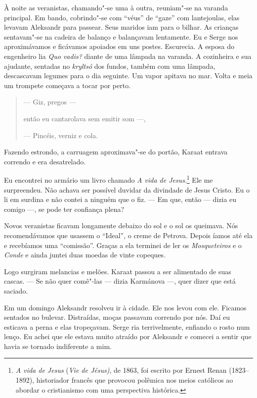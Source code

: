 À noite as veranistas, chamando"-se uma à outra, reuniam"-se na varanda
principal. Em bando, cobrindo"-se com ``véus'' de ``gaze'' com
lantejoulas, elas levavam Aleksandr para passear. Seus maridos iam para
o bilhar. As crianças sentavam"-se na cadeira de balanço e balançavam
lentamente. Eu e Serge nos aproximávamos e ficávamos apoiados em uns
postes. Escurecia. A esposa do engenheiro lia \emph{Quo vadis?} diante
de uma lâmpada na varanda. A cozinheira e sua ajudante, sentadas no
\emph{kryltsó} dos fundos, também com uma lâmpada, descascavam legumes
para o dia seguinte. Um vapor apitava no mar. Volta e meia um trompete
começava a tocar por perto.

\begin{quotation}
--- Giz, pregos ---

então eu cantarolava sem emitir som ---,

--- Pincéis, verniz e cola.
\end{quotation}

Fazendo estrondo, a carruagem aproximava"-se do portão, Karaat entrava
correndo e era desatrelado.

Eu encontrei no armário um livro chamado \emph{A vida de
Jesus}.\footnote{\emph{A vida de Jesus} (\emph{Vie de Jésus)}, de 1863,
  foi escrito por Ernest Renan (1823--1892), historiador francês que
  provocou polêmica nos meios católicos ao abordar o cristianismo com
  uma perspectiva histórica.} Ele me surpreendeu. Não achava ser
possível duvidar da divindade de Jesus Cristo. Eu o li em surdina e não
contei a ninguém que o fiz. --- Em que, então --- dizia eu comigo ---,
se pode ter confiança plena?

Novos veranistas ficavam longamente debaixo do sol e o sol os queimava.
Nós recomendávamos que usassem o ``Ideal'', o creme de Petrova. Depois
íamos até ela e recebíamos uma ``comissão''. Graças a ela terminei de
ler os \emph{Mosqueteiros} e o \emph{Conde} e ainda juntei duas moedas
de vinte copeques.

Logo surgiram melancias e melões. Karaat passou a ser alimentado de suas
cascas. --- Se não quer comê"-las --- dizia Karmánova ---, quer dizer que
está saciado.

Em um domingo Aleksandr resolveu ir à cidade. Ele nos levou com ele.
Ficamos sentados no bulevar. Distraídas, moças passavam correndo por
nós. Daí eu esticava a perna e elas tropeçavam. Serge ria terrivelmente,
enfiando o rosto num lenço. Eu achei que ele estava muito atraído por
Aleksandr e comecei a sentir que havia se tornado indiferente a mim.

